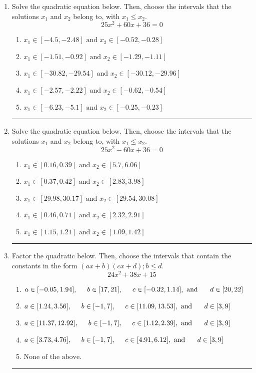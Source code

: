 \documentclass[14pt]{extbook}
\newcommand{\litem}[1]{\item#1\hspace*{-1cm}\rule{\textwidth}{0.4pt}}
\begin{document}
\begin{enumerate}
\litem{
Solve the quadratic equation below. Then, choose the intervals that the solutions $x_1$ and $x_2$ belong to, with $x_1 \leq x_2$.\[ 25x^{2} +60 x + 36 = 0 \]\begin{enumerate}[label=\Alph*.]
\item \( x_1 \in [-4.5, -2.48] \text{ and } x_2 \in [-0.52, -0.28] \)
\item \( x_1 \in [-1.51, -0.92] \text{ and } x_2 \in [-1.29, -1.11] \)
\item \( x_1 \in [-30.82, -29.54] \text{ and } x_2 \in [-30.12, -29.96] \)
\item \( x_1 \in [-2.57, -2.22] \text{ and } x_2 \in [-0.62, -0.54] \)
\item \( x_1 \in [-6.23, -5.1] \text{ and } x_2 \in [-0.25, -0.23] \)

\end{enumerate} }
\litem{
Solve the quadratic equation below. Then, choose the intervals that the solutions $x_1$ and $x_2$ belong to, with $x_1 \leq x_2$.\[ 25x^{2} -60 x + 36 = 0 \]\begin{enumerate}[label=\Alph*.]
\item \( x_1 \in [0.16, 0.39] \text{ and } x_2 \in [5.7, 6.06] \)
\item \( x_1 \in [0.37, 0.42] \text{ and } x_2 \in [2.83, 3.98] \)
\item \( x_1 \in [29.98, 30.17] \text{ and } x_2 \in [29.54, 30.08] \)
\item \( x_1 \in [0.46, 0.71] \text{ and } x_2 \in [2.32, 2.91] \)
\item \( x_1 \in [1.15, 1.21] \text{ and } x_2 \in [1.09, 1.42] \)

\end{enumerate} }
\litem{
Factor the quadratic below. Then, choose the intervals that contain the constants in the form $(ax+b)(cx+d); b \leq d.$\[ 24x^{2} +38 x + 15 \]\begin{enumerate}[label=\Alph*.]
\item \( a \in [-0.05, 1.94], \hspace*{5mm} b \in [17, 21], \hspace*{5mm} c \in [-0.32, 1.14], \text{ and } \hspace*{5mm} d \in [20, 22] \)
\item \( a \in [1.24, 3.56], \hspace*{5mm} b \in [-1, 7], \hspace*{5mm} c \in [11.09, 13.53], \text{ and } \hspace*{5mm} d \in [3, 9] \)
\item \( a \in [11.37, 12.92], \hspace*{5mm} b \in [-1, 7], \hspace*{5mm} c \in [1.12, 2.39], \text{ and } \hspace*{5mm} d \in [3, 9] \)
\item \( a \in [3.73, 4.76], \hspace*{5mm} b \in [-1, 7], \hspace*{5mm} c \in [4.91, 6.12], \text{ and } \hspace*{5mm} d \in [3, 9] \)
\item \( \text{None of the above.} \)


\end{enumerate}}
\end{enumerate}
\end{document}
